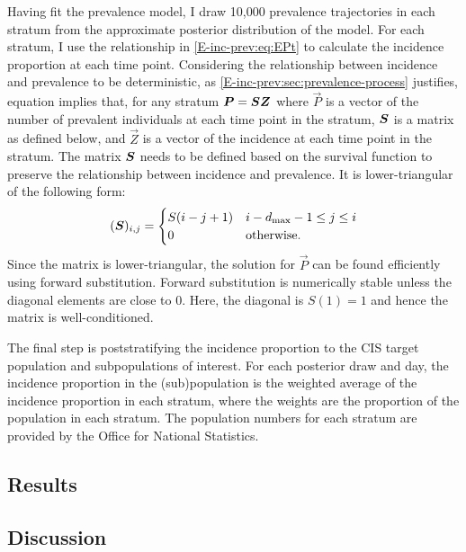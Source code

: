 \documentclass[thesis.tex]{subfiles}
\begin{document}
Having fit the prevalence model, I draw 10,000 prevalence trajectories in each stratum from the approximate posterior distribution of the model.
For each stratum, I use the relationship in \cref{E-inc-prev:eq:EPt} to calculate the incidence proportion at each time point.
Considering the relationship between incidence and prevalence to be deterministic, as \cref{E-inc-prev:sec:prevalence-process} justifies, equation implies that, for any stratum $\bm{P} = \bm{S} \bm{Z}$ where $\vec{P}$ is a vector of the number of prevalent individuals at each time point in the stratum, $\bm{S}$ is a matrix as defined below, and $\vec{Z}$ is a vector of the incidence at each time point in the stratum.
The matrix $\bm{S}$ needs to be defined based on the survival function to preserve the relationship between incidence and prevalence.
It is lower-triangular of the following form:
\begin{align}
    (\bm{S})_{i,j} = \begin{cases}
        S(i - j + 1) & i - d_\text{max} - 1 \leq j \leq i \\
        0 & \text{otherwise.}
    \end{cases}
\end{align}
Since the matrix is lower-triangular, the solution for $\vec{P}$ can be found efficiently using forward substitution.
Forward substitution is numerically stable unless the diagonal elements are close to 0.
Here, the diagonal is $S(1) = 1$ and hence the matrix is well-conditioned.

The final step is poststratifying the incidence proportion to the CIS target population and subpopulations of interest.
For each posterior draw and day, the incidence proportion in the (sub)population is the weighted average of the incidence proportion in each stratum, where the weights are the proportion of the population in each stratum.
The population numbers for each stratum are provided by the Office for National Statistics.

\subsection{Results} \label{backcalc:sec:results}

\subsection{Discussion} \label{backcalc:sec:discussion}
\end{document}
